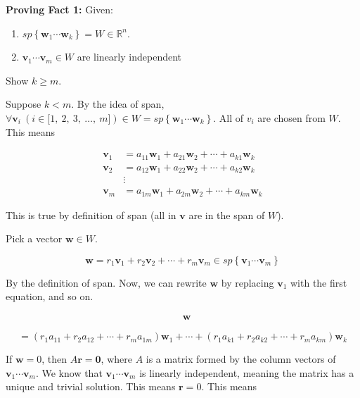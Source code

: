 \documentclass[
]{article}
\begin{document}
\textbf{Proving Fact 1:} Given:

\begin{enumerate}
\def\labelenumi{\arabic{enumi}.}
\item
  $sp\left\{ {\mathbf{w}}_{1}\cdots{\mathbf{w}}_{k} \right\} = W \in \mathbb{R}^{n}$.
\item
  ${\mathbf{v}}_{1}\cdots{\mathbf{v}}_{m} \in W$ are linearly
  independent
\end{enumerate}

Show $k \geq m$.

Suppose $k < m$. By the idea of span,
$\forall{\mathbf{v}}_{i}\ \left( i \in \lbrack 1,\ 2,\ 3,\ \ldots,\ m\rbrack \right) \in W = sp\left\{ {\mathbf{w}}_{1}\cdots{\mathbf{w}}_{k} \right\}$.
All of $v_{i}$ are chosen from $W$. This means

\begin{align*}
{\mathbf{v}}_{1} &= a_{11}{\mathbf{w}}_{1} + a_{21}{\mathbf{w}}_{2} + \cdots + a_{k1}{\mathbf{w}}_{k}
 \\
{\mathbf{v}}_{2} &= a_{12}{\mathbf{w}}_{1} + a_{22}{\mathbf{w}}_{2} + \cdots + a_{k2}{\mathbf{w}}_{k}
 \\
&\vdots 
 \\
{\mathbf{v}}_{m} &= a_{1m}{\mathbf{w}}_{1} + a_{2m}{\mathbf{w}}_{2} + \cdots + a_{km}{\mathbf{w}}_{k}
\end{align*}


This is true by definition of span (all in $\mathbf{v}$ are in the
span of $W$).

Pick a vector $\mathbf{w} \in W$.

$$\mathbf{w} = r_{1}{\mathbf{v}}_{1} + r_{2}{\mathbf{v}}_{2} + \cdots + r_{m}{\mathbf{v}}_{m} \in sp\left\{ {\mathbf{v}}_{1}\cdots{\mathbf{v}}_{m} \right\}$$

By the definition of span. Now, we can rewrite $\mathbf{w}$ by
replacing ${\mathbf{v}}_{1}$ with the first equation, and so on.

\begin{align*}
&\mathbf{w}
\end{align*}


$$= \left( r_{1}a_{11} + r_{2}a_{12} + \cdots + r_{m}a_{1m} \right){\mathbf{w}}_{1} + \cdots + \left( r_{1}a_{k1} + r_{2}a_{k2} + \cdots + r_{m}a_{km} \right){\mathbf{w}}_{k}$$

If $\mathbf{w} = 0$, then $A\mathbf{r} = \mathbf{0}$,
where $A$ is a matrix formed by the column vectors of
${\mathbf{v}}_{1}\cdots{\mathbf{v}}_{m}$. We know that
${\mathbf{v}}_{1}\cdots{\mathbf{v}}_{m}$ is linearly
independent, meaning the matrix has a unique and trivial solution. This
means $\mathbf{r} = 0$. This means
\end{document}
